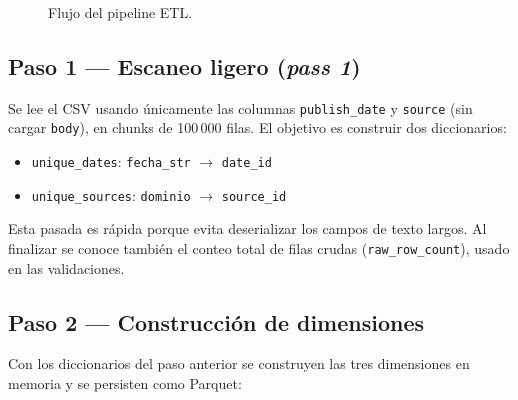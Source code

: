 \documentclass[11pt, letterpaper]{article}
\begin{document}
\begin{figure}[H]
\centering
{}
\caption{Flujo del pipeline ETL.}
\end{figure}

\subsection{Paso 1 --- Escaneo ligero (\textit{pass 1})}

Se lee el CSV usando únicamente las columnas \texttt{publish\_date} y
\texttt{source} (sin cargar \texttt{body}), en chunks de 100\,000 filas.
El objetivo es construir dos diccionarios:
\begin{itemize}[noitemsep]
  \item \texttt{unique\_dates}: \texttt{fecha\_str} $\to$ \texttt{date\_id}
  \item \texttt{unique\_sources}: \texttt{dominio} $\to$ \texttt{source\_id}
\end{itemize}
Esta pasada es rápida porque evita deserializar los campos de texto largos.
Al finalizar se conoce también el conteo total de filas crudas
(\texttt{raw\_row\_count}), usado en las validaciones.

\subsection{Paso 2 --- Construcción de dimensiones}

Con los diccionarios del paso anterior se construyen las tres dimensiones
en memoria y se persisten como Parquet:
\end{document}
